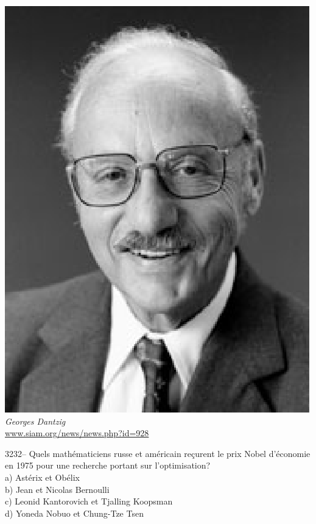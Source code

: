 \documentclass[letterpaper, 12pt]{article}
\begin{document}
\begin{center}
\includegraphics[scale=0.3]{dantzig.eps}\\
\emph{{\small Georges Dantzig}}\\
\href{http://www.siam.org/news/news.php?id=928}{www.siam.org/news/news.php?id=928}\\[5mm]
\end{center}



3232-- Quels math\'ematiciens russe et am\'ericain re\c curent le prix Nobel d'\'economie en 1975 pour une recherche portant sur l'optimisation?\\

a) Ast\'erix et Ob\'elix\\
b) Jean et Nicolas Bernoulli\\
c) Leonid Kantorovich et Tjalling Koopsman\\
d) Yoneda Nobuo et Chung-Tze Tsen\\
\end{document}
